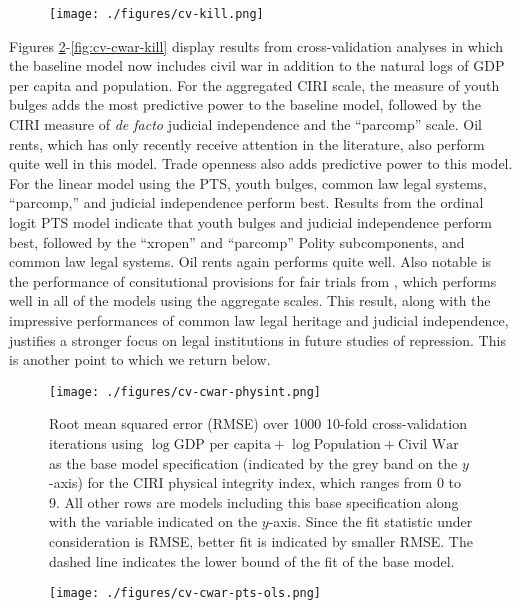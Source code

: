\documentclass[12pt]{article}
\begin{document}
\begin{figure}[!htpb]
\centering
\texttt{[image: ./figures/cv-kill.png]}
\caption{}
\label{fig:cv-kill}
\end{figure}

Figures \ref{fig:cv-cwar-physint}-\ref{fig:cv-cwar-kill} display results from cross-validation analyses in which the baseline model now includes civil war in addition to the natural logs of GDP per capita and population. For the aggregated CIRI scale, the measure of youth bulges adds the most predictive power to the baseline model, followed by the CIRI measure of {\it de facto} judicial independence and the ``parcomp'' scale. Oil rents, which has only recently receive attention in the literature, also perform quite well in this model. Trade openness also adds predictive power to this model. For the linear model using the PTS, youth bulges, common law legal systems, ``parcomp,'' and judicial independence perform best. Results from the ordinal logit PTS model indicate that youth bulges and judicial independence perform best, followed by the ``xropen'' and ``parcomp'' Polity subcomponents, and common law legal systems. Oil rents again performs quite well. Also notable is the performance of consitutional provisions for fair trials from \citet{KeithTatePoe2009}, which performs well in all of the models using the aggregate scales. This result, along with the impressive performances of common law legal heritage and judicial independence, justifies a stronger focus on legal institutions in future studies of repression. This is another point to which we return below. 

\begin{figure}[!htpb]
\centering
\texttt{[image: ./figures/cv-cwar-physint.png]}
\caption{Root mean squared error (RMSE) over 1000 10-fold cross-validation iterations using $\log \text{GDP per capita} + \log \text{Population} + \text{Civil War}$ as the base model specification (indicated by the grey band on the $y$-axis) for the CIRI physical integrity index, which ranges from 0 to 9. All other rows are models including this base specification along with the variable indicated on the $y$-axis. Since the fit statistic under consideration is RMSE, better fit is indicated by smaller RMSE. The dashed line indicates the lower bound of the fit of the base model.}
\caption{}
\label{fig:cv-cwar-physint}
\end{figure}

\begin{figure}[!htpb]
\centering
\texttt{[image: ./figures/cv-cwar-pts-ols.png]}
\caption{}
\label{fig:cv-cwar-pts-ols}
\end{figure}
\end{document}
